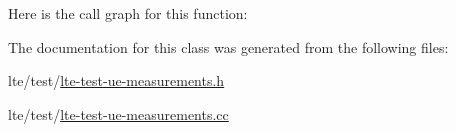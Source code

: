 Here is the call graph for this function\+:




The documentation for this class was generated from the following files\+:\begin{DoxyCompactItemize}
\item 
lte/test/\hyperlink{lte-test-ue-measurements_8h}{lte-\/test-\/ue-\/measurements.\+h}\item 
lte/test/\hyperlink{lte-test-ue-measurements_8cc}{lte-\/test-\/ue-\/measurements.\+cc}\end{DoxyCompactItemize}
